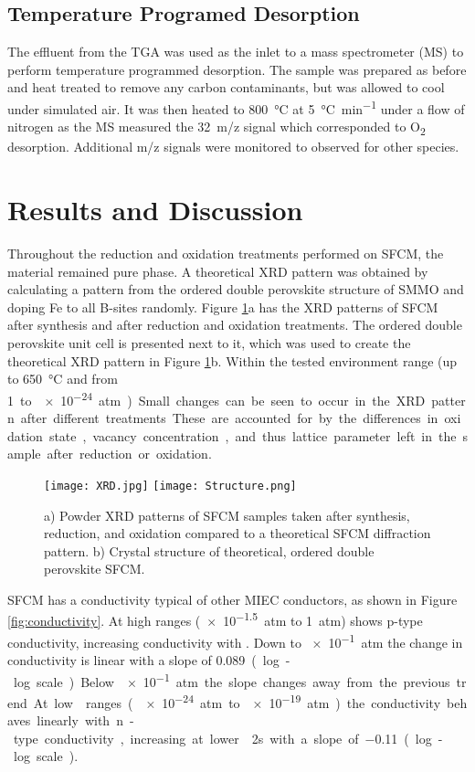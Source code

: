     \subsection{Temperature Programed Desorption}
        The effluent from the TGA was used as the inlet to a mass spectrometer (MS) to perform temperature programmed desorption.
        The sample was prepared as before and heat treated to remove any carbon contaminants, but was allowed to cool under simulated air.
        It was then heated to \SI{800}{\celsius} at \SI{5}{\celsius\per\minute} under a flow of nitrogen as the MS measured the \SI{32}{m/z} signal which corresponded to O\textsubscript{2} desorption.
        Additional m/z signals were monitored to observed for other species.

\section{Results and Discussion}
    Throughout the reduction and oxidation treatments performed on SFCM, the material remained pure phase.
    A theoretical XRD pattern was obtained by calculating a pattern from the ordered double perovskite structure of SMMO and doping Fe to all B-sites randomly.
    Figure \ref{fig:structure}a has the XRD patterns of SFCM after synthesis and after reduction and oxidation treatments.
    The ordered double perovskite unit cell is presented next to it, which was used to create the theoretical XRD pattern in Figure \ref{fig:structure}b.\cite{Momma2011}
    Within the tested environment range (up to \SI{650}{\celsius} and  from \SI{1} to \SI{e-24}{atm})

    Small changes can be seen to occur in the XRD pattern after different treatments.
    These are accounted for by the differences in oxidation state, vacancy concentration, and thus lattice parameter left in the sample after reduction or oxidation.

    \begin{figure}
      \texttt{[image: XRD.jpg]}
      \texttt{[image: Structure.png]}
      \caption{a) Powder XRD patterns of SFCM samples taken after synthesis, reduction, and oxidation compared to a theoretical SFCM diffraction pattern. b) Crystal structure of theoretical, ordered double perovskite SFCM. }
      \label{fig:structure}
    \end{figure}

    SFCM has a conductivity typical of other MIEC conductors, as shown in Figure \ref{fig:conductivity}.
    At high  ranges (\SI{e-1.5}{atm} to \SI{1}{atm}) shows p-type conductivity, increasing conductivity with .
    Down to \SI{e-1}{atm} the change in conductivity is linear with a slope of \SI{0.089} (log-log scale).
    Below \SI{e-1}{atm} the slope changes away from the previous trend.
    At low  ranges (\SI{e-24}{atm} to \SI{e-19}{atm}) the conductivity behaves linearly with n-type conductivity, increasing at lower \po2s with a slope of \SI{-0.11} (log-log scale).

